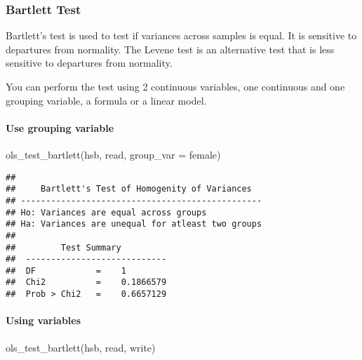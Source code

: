 \documentclass[
]{article}
\newenvironment{Shaded}{\begin{snugshade}}{\end{snugshade}}
\newcommand{\AttributeTok}[1]{\textcolor[rgb]{0.77,0.63,0.00}{#1}}
\newcommand{\FunctionTok}[1]{\textcolor[rgb]{0.00,0.00,0.00}{#1}}
\newcommand{\NormalTok}[1]{#1}
\newcommand{\StringTok}[1]{\textcolor[rgb]{0.31,0.60,0.02}{#1}}
\begin{document}
\hypertarget{bartlett-test}{%
\subsubsection{Bartlett Test}\label{bartlett-test}}

Bartlett's test is used to test if variances across samples is equal. It
is sensitive to departures from normality. The Levene test is an
alternative test that is less sensitive to departures from normality.

You can perform the test using 2 continuous variables, one continuous
and one grouping variable, a formula or a linear model.

\hypertarget{use-grouping-variable}{%
\paragraph{Use grouping variable}\label{use-grouping-variable}}

\begin{Shaded}
\begin{Highlighting}[]
\FunctionTok{ols\_test\_bartlett}\NormalTok{(hsb, }\StringTok{\textquotesingle{}read\textquotesingle{}}\NormalTok{, }\AttributeTok{group\_var =} \StringTok{\textquotesingle{}female\textquotesingle{}}\NormalTok{)}
\end{Highlighting}
\end{Shaded}

\begin{verbatim}
## 
##     Bartlett's Test of Homogenity of Variances    
## ------------------------------------------------
## Ho: Variances are equal across groups
## Ha: Variances are unequal for atleast two groups
## 
##         Test Summary         
##  ----------------------------
##  DF            =    1 
##  Chi2          =    0.1866579 
##  Prob > Chi2   =    0.6657129
\end{verbatim}

\hypertarget{using-variables}{%
\paragraph{Using variables}\label{using-variables}}

\begin{Shaded}
\begin{Highlighting}[]
\FunctionTok{ols\_test\_bartlett}\NormalTok{(hsb, }\StringTok{\textquotesingle{}read\textquotesingle{}}\NormalTok{, }\StringTok{\textquotesingle{}write\textquotesingle{}}\NormalTok{)}
\end{Highlighting}
\end{Shaded}
\end{document}
